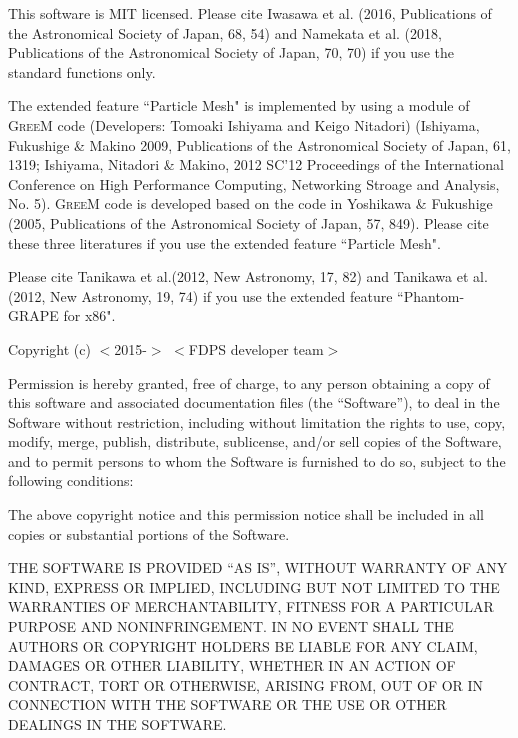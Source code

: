 This software is MIT licensed. Please cite Iwasawa et al. (2016, Publications of the Astronomical Society of Japan, 68, 54) and Namekata et al. (2018, Publications of the Astronomical Society of Japan, 70, 70) if you use the standard functions only.

The extended feature ``Particle Mesh" is implemented by using a module of \textsc{GreeM} code (Developers: Tomoaki Ishiyama and Keigo Nitadori) (Ishiyama, Fukushige \& Makino 2009, Publications of the Astronomical Society of Japan, 61, 1319; Ishiyama, Nitadori \& Makino, 2012 SC'12 Proceedings of the International Conference on High Performance Computing, Networking Stroage and Analysis, No. 5). \textsc{GreeM} code is developed based on the code in Yoshikawa \& Fukushige (2005, Publications of the Astronomical Society of Japan, 57, 849). Please cite these three literatures if you use the extended feature ``Particle Mesh". 

Please cite Tanikawa et al.(2012, New Astronomy, 17, 82) and Tanikawa et al.(2012, New Astronomy, 19, 74) if you use the extended feature ``Phantom-GRAPE for x86".

\vspace{5mm}

Copyright (c) $<$2015-$>$ $<$FDPS developer team$>$

\vspace{3mm}

Permission is hereby granted, free of charge, to any person obtaining a copy of this software and associated documentation files (the ``Software''), to deal in the Software without restriction, including without limitation the rights to use, copy, modify, merge, publish, distribute, sublicense, and/or sell copies of the Software, and to permit persons to whom the Software is furnished to do so, subject to the following conditions:

\vspace{3mm}

The above copyright notice and this permission notice shall be
included in all copies or substantial portions of the Software.

\vspace{3mm}

THE SOFTWARE IS PROVIDED ``AS IS'', WITHOUT WARRANTY OF ANY KIND, EXPRESS OR IMPLIED, INCLUDING BUT NOT LIMITED TO THE WARRANTIES OF MERCHANTABILITY, FITNESS FOR A PARTICULAR PURPOSE AND NONINFRINGEMENT. IN NO EVENT SHALL THE AUTHORS OR COPYRIGHT HOLDERS BE LIABLE FOR ANY CLAIM, DAMAGES OR OTHER LIABILITY, WHETHER IN AN ACTION OF CONTRACT, TORT OR OTHERWISE, ARISING FROM, OUT OF OR IN CONNECTION WITH THE SOFTWARE OR THE USE OR OTHER DEALINGS IN THE SOFTWARE.

